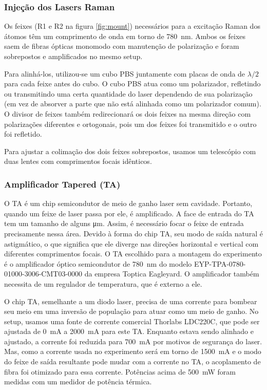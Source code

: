 \subsubsection{Injeção dos Lasers Raman}
Os feixes (R1 e R2 na figura \ref{fig:mount}) necessários para a excitação Raman dos átomos têm um comprimento de onda em torno de \SI{780}{nm}. Ambos os feixes saem de fibras ópticas monomodo com manutenção de polarização e foram sobrepostos e amplificados no mesmo setup.

Para alinhá-los, utilizou-se um cubo \gls{PBS} juntamente com placas de onda de $\lambda /2$ para cada feixe antes do cubo. O cubo \gls{PBS} atua como um polarizador, refletindo ou transmitindo uma certa quantidade do laser dependendo de sua polarização (em vez de absorver a parte que não está alinhada como um polarizador comum). O divisor de feixes também redirecionará os dois feixes na mesma direção com polarizações diferentes e ortogonais, pois um dos feixes foi transmitido e o outro foi refletido.

Para ajustar a colimação dos dois feixes sobrepostos, usamos um telescópio com duas lentes com comprimentos focais idênticos.

\subsubsection{Amplificador Tapered (TA)}
O \gls{TA} é um chip semicondutor de meio de ganho laser sem cavidade. Portanto, quando um feixe de laser passa por ele, é amplificado. A face de entrada do TA tem um tamanho de alguns \si{\micro m}. Assim, é necessário focar o feixe de entrada precisamente nessa área. Devido à forma do chip TA, seu modo de saída natural é astigmático, o que significa que ele diverge nas direções horizontal e vertical com diferentes comprimentos focais. O \gls{TA} escolhido para a montagem do experimento é o amplificador óptico semicondutor de \SI{780}{nm} do modelo EYP-TPA-0780-01000-3006-CMT03-0000 da empresa Toptica Eagleyard. O amplificador também necessita de um regulador de temperatura, que é externo a ele.

O chip TA, semelhante a um diodo laser, precisa de uma corrente para bombear seu meio em uma inversão de população para atuar como um meio de ganho. No setup, usamos uma fonte de corrente comercial Thorlabs LDC220C, que pode ser ajustada de \SI{0}{mA} a \SI{2000}{\mA} para este \gls{TA}. Enquanto estava sendo alinhado e ajustado, a corrente foi reduzida para \SI{700}{mA} por motivos de segurança do laser. Mas, como a corrente usada no experimento será em torno de \SI{1500}{mA} e o modo do feixe de saída resultante pode mudar com a corrente no \gls{TA}, o acoplamento de fibra foi otimizado para essa corrente. Potências acima de \SI{500}{mW} foram medidas com um medidor de potência térmica.

